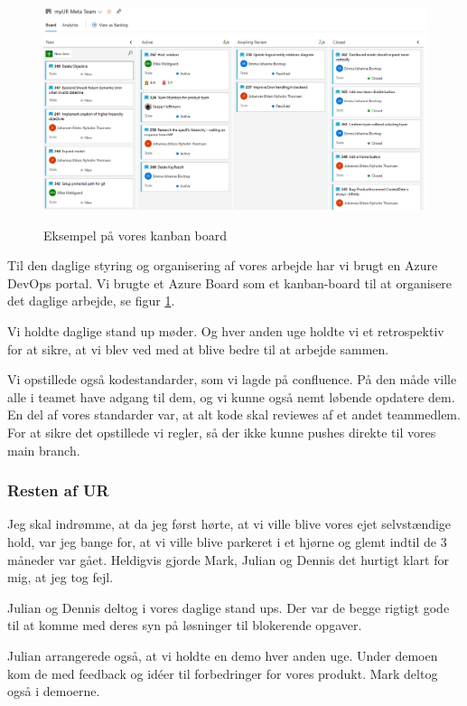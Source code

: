 \documentclass[a4paper]{article}
\begin{document}
\begin{figure}[ht!]
    \includegraphics[width=\linewidth]{kanbanboard.png}
    \centering
    \label{kanban}
    \caption{Eksempel på vores kanban board}
\end{figure}

Til den daglige styring og organisering af vores arbejde
har vi brugt en Azure DevOps portal.
Vi brugte et Azure Board som et kanban-board
til at organisere det daglige arbejde, se figur \ref{kanban}.

Vi holdte daglige stand up møder.
Og hver anden uge holdte vi et retrospektiv for at sikre,
at vi blev ved med at blive bedre til at arbejde sammen.

Vi opstillede også kodestandarder, som vi lagde på confluence.
På den måde ville alle i teamet have adgang til dem,
og vi kunne også nemt løbende opdatere dem.
En del af vores standarder var,
at alt kode skal reviewes af et andet teammedlem.
For at sikre det opstillede vi regler,
så der ikke kunne pushes direkte til vores main branch.

\subsubsection{Resten af UR}
Jeg skal indrømme, at da jeg først hørte,
at vi ville blive vores ejet selvstændige hold,
var jeg bange for,
at vi ville blive parkeret i et hjørne og glemt indtil de 3 måneder var gået.
Heldigvis gjorde Mark, Julian og Dennis det hurtigt klart for mig,
at jeg tog fejl.

Julian og Dennis deltog i vores daglige stand ups.
Der var de begge rigtigt gode til at komme med deres syn på løsninger til blokerende opgaver.

Julian arrangerede også, at vi holdte en demo hver anden uge.
Under demoen kom de med feedback og idéer til forbedringer for vores produkt.
Mark deltog også i demoerne.
\end{document}
